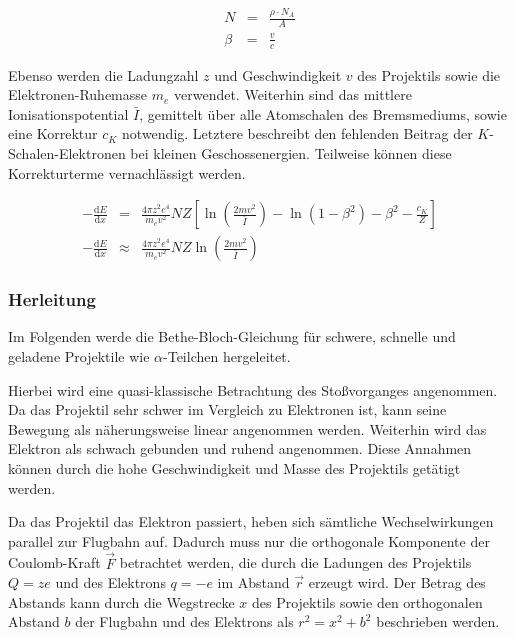 \documentclass[12pt,a4paper]{scrartcl}
\numberwithin{equation}{section} %
\begin{document}
\begin{eqnarray}
    N &=& \frac{\rho\cdot N_A}{A} \\
    \beta &=& \frac{v}{c}
\end{eqnarray}

Ebenso werden die Ladungzahl $z$ und Geschwindigkeit $v$ des Projektils sowie die Elektronen-Ruhemasse $m_e$ verwendet. Weiterhin sind das mittlere Ionisationspotential $\bar I$, gemittelt über alle Atomschalen des Bremsmediums, sowie eine Korrektur $c_K$ notwendig. Letztere beschreibt den fehlenden Beitrag der $K$-Schalen-Elektronen bei kleinen Geschossenergien. Teilweise können diese Korrekturterme vernachlässigt werden.

\begin{eqnarray}
    -\frac{\mathrm dE}{\mathrm dx} &=&
        \frac{4\pi z^2 e^4}{m_e v^2} NZ
        \left[
            \ln\left(\frac{2mv^2}{\bar I}\right)
            - \ln\left(1 - \beta^2\right)
            - \beta^2
            - \frac{c_K}{Z}
        \right]
        \label{BetheBloch} \\
    -\frac{\mathrm dE}{\mathrm dx} &\approx&
        \frac{4\pi z^2 e^4}{m_e v^2} NZ
        \ln\left(\frac{2mv^2}{\bar I}\right)
        \label{BetheBloch2}
\end{eqnarray}

\hypertarget{herleitung}{%
\subsubsection{Herleitung}\label{herleitung}}

Im Folgenden werde die Bethe-Bloch-Gleichung für schwere, schnelle und geladene Projektile wie $\alpha$-Teilchen hergeleitet.

Hierbei wird eine quasi-klassische Betrachtung des Stoßvorganges angenommen. Da das Projektil sehr schwer im Vergleich zu Elektronen ist, kann seine Bewegung als näherungsweise linear angenommen werden. Weiterhin wird das Elektron als schwach gebunden und ruhend angenommen. Diese Annahmen können durch die hohe Geschwindigkeit und Masse des Projektils getätigt werden.

Da das Projektil das Elektron passiert, heben sich sämtliche Wechselwirkungen parallel zur Flugbahn auf. Dadurch muss nur die orthogonale Komponente der Coulomb-Kraft $\vec F$ betrachtet werden, die durch die Ladungen des Projektils $Q=ze$ und des Elektrons $q=-e$ im Abstand $\vec r$ erzeugt wird. Der Betrag des Abstands kann durch die Wegstrecke $x$ des Projektils sowie den orthogonalen Abstand $b$ der Flugbahn und des Elektrons als $r^2=x^2+b^2$ beschrieben werden.
\end{document}
